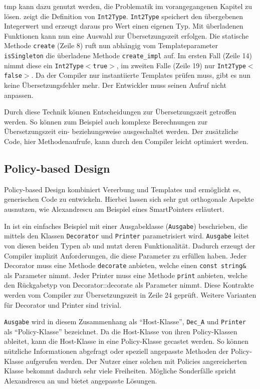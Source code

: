 \ac{tmp} kann dazu genutzt werden, die Problematik im vorangegangenen Kapitel zu lösen.  zeigt die Definition von \texttt{Int2Type}. \texttt{Int2Type} speichert den übergebenen Integerwert und erzeugt daraus pro Wert einen eigenen Typ. Mit überladenen Funktionen kann nun eine Auswahl zur Übersetzungszeit erfolgen. Die statische Methode \texttt{create} (Zeile 8) ruft nun abhängig vom Templateparameter \texttt{isSingleton} die überladene Methode \texttt{create\_impl} auf. Im ersten Fall (Zeile 14) nimmt diese ein \texttt{Int2Type$<$true$>$}, im zweiten Falle (Zeile 19) nur \texttt{Int2Type$<$false$>$}. Da der Compiler nur instantiierte Templates prüfen muss, gibt es nun keine Übersetzungsfehler mehr. Der Entwickler muss seinen Aufruf nicht anpassen.



Durch diese Technik können Entscheidungen zur Übersetzungszeit getroffen werden. So können zum Beispiel auch komplexe Berechnungen zur Übersetzungszeit ein- beziehungsweise ausgeschaltet werden. Der zusätzliche Code, hier Methodenaufrufe, kann durch den Compiler leicht optimiert werden.

\subsection{Policy-based Design}
Policy-based Design kombiniert Vererbung und Templates und ermöglicht es, generischen Code zu entwickeln. Hierbei lassen sich sehr gut orthogonale Aspekte ausnutzen, wie Alexandrescu am Beispiel eines SmartPointers erläutert.

In  ist ein einfaches Beispiel mit einer Ausgabeklasse (\texttt{Ausgabe}) beschrieben, die mittels den Klassen \texttt{Decorator} und \texttt{Printer} parametrisiert wird. \texttt{Ausgabe} leitet von diesen beiden Typen ab und nutzt deren Funktionalität. Dadurch erzeugt der Compiler implizit Anforderungen, die diese Parameter zu erfüllen haben. Jeder Decorator muss eine Methode \texttt{decorate} anbieten, welche einen \texttt{const string\&} als Parameter nimmt. Jeder Printer muss eine Methode \texttt{print} anbieten, welche den Rückgabetyp von Decorator::decorate als Parameter nimmt. Diese Kontrakte werden vom Compiler zur Übersetzungszeit in Zeile 24 geprüft. Weitere Varianten für Decorator und Printer sind trivial.

\texttt{Ausgabe} wird in diesem Zusammenhang als \enquote{Host-Klasse}, \texttt{Dec\_A} und \texttt{Printer} als \enquote{Policy-Klasse} bezeichnet. Da die Host-Klasse von ihren Policy-Klassen ableitet, kann die Host-Klasse in eine Policy-Klasse gecastet werden. So können nützliche Informationen abgefragt oder speziell angepasste Methoden der Policy-Klasse aufgerufen werden. Der Nutzer einer solchen mit Policies angereicherten Klasse bekommt dadurch sehr viele Freiheiten. Mögliche Sonderfälle spricht Alexandrescu an und bietet angepasste Lösungen.

